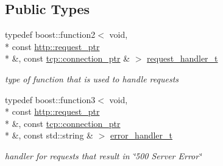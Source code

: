 \subsection*{Public Types}
\begin{DoxyCompactItemize}
\item 
typedef boost\-::function2$<$ void, \\*
const \hyperlink{namespacepion_1_1http_ace432b70a9459d50ff4969a7a47f0ccb}{http\-::request\-\_\-ptr} \\*
\&, const \hyperlink{namespacepion_1_1tcp_a6c9b7497068009f6d81d95ec0b0627d6}{tcp\-::connection\-\_\-ptr} \& $>$ \hyperlink{classpion_1_1http_1_1server_a9a5ae02baccb5646a5a76b99dc44df6e}{request\-\_\-handler\-\_\-t}
\begin{DoxyCompactList}\small\item\em type of function that is used to handle requests \end{DoxyCompactList}\item 
typedef boost\-::function3$<$ void, \\*
const \hyperlink{namespacepion_1_1http_ace432b70a9459d50ff4969a7a47f0ccb}{http\-::request\-\_\-ptr} \\*
\&, const \hyperlink{namespacepion_1_1tcp_a6c9b7497068009f6d81d95ec0b0627d6}{tcp\-::connection\-\_\-ptr} \\*
\&, const std\-::string \& $>$ \hyperlink{classpion_1_1http_1_1server_abc3b778d656bfb9dfa0b63315b5369f9}{error\-\_\-handler\-\_\-t}
\begin{DoxyCompactList}\small\item\em handler for requests that result in \char`\"{}500 Server Error\char`\"{} \end{DoxyCompactList}\end{DoxyCompactItemize}
